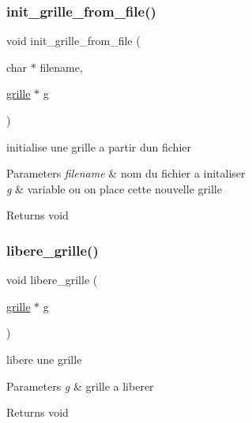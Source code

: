 \subsubsection{\texorpdfstring{init\+\_\+grille\+\_\+from\+\_\+file()}{init\_grille\_from\_file()}}
{\footnotesize\ttfamily void init\+\_\+grille\+\_\+from\+\_\+file (\begin{DoxyParamCaption}\item[{char $\ast$}]{filename,  }\item[{\hyperlink{structgrille}{grille} $\ast$}]{g }\end{DoxyParamCaption})\hspace{0.3cm}{\ttfamily [related]}}

initialise une grille a partir d\textquotesingle{}un fichier


\begin{DoxyParams}{Parameters}
{\em filename} & nom du fichier a initaliser \\
\hline
{\em g} & variable ou on place cette nouvelle grille \\
\hline
\end{DoxyParams}
\begin{DoxyReturn}{Returns}
{\ttfamily void} 
\end{DoxyReturn}
\mbox{\label{structgrille_a7074b2b15576e9d2b3cd15c3a1dc7012}} 
\subsubsection{\texorpdfstring{libere\+\_\+grille()}{libere\_grille()}}
{\footnotesize\ttfamily void libere\+\_\+grille (\begin{DoxyParamCaption}\item[{\hyperlink{structgrille}{grille} $\ast$}]{g }\end{DoxyParamCaption})\hspace{0.3cm}{\ttfamily [related]}}

libere une grille


\begin{DoxyParams}{Parameters}
{\em g} & grille a liberer \\
\hline
\end{DoxyParams}
\begin{DoxyReturn}{Returns}
{\ttfamily void} 
\end{DoxyReturn}
\mbox{\label{structgrille_a10e7b11f2de74ccf95ad1fcb3671a163}} 
